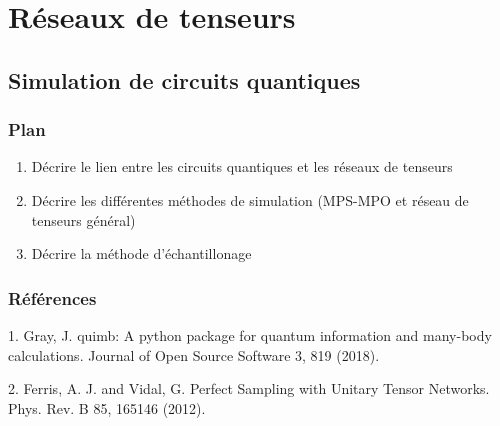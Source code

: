 \begin{comment}
\end{comment}

\appendix
\renewcommand\chapterstring{Annexe}
\chapter{Réseaux de tenseurs}


\section{Simulation de circuits quantiques}

\subsection*{Plan}

\begin{enumerate}
    \item Décrire le lien entre les circuits quantiques et les réseaux de tenseurs
    \item Décrire les différentes méthodes de simulation (MPS-MPO et réseau de tenseurs général)
    \item Décrire la méthode d'échantillonage
\end{enumerate}

\subsection*{Références}

1. Gray, J. quimb: A python package for quantum information and many-body calculations. Journal of Open Source Software 3, 819 (2018).

2. Ferris, A. J. and Vidal, G. Perfect Sampling with Unitary Tensor Networks. Phys. Rev. B 85, 165146 (2012).


